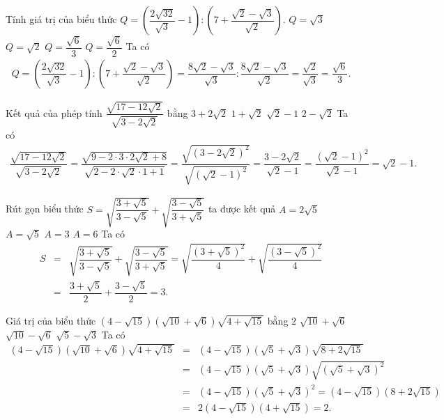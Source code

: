 \begin{bt}
	Tính giá trị của biểu thức $Q=\left(\dfrac{2\sqrt{32}}{\sqrt{3}}-1\right):\left(7+\dfrac{\sqrt{2}-\sqrt{3}}{\sqrt{2}}\right)$.
	\choice
	{$Q=\sqrt{3}$}
	{$Q=\sqrt{2}$}
	{\True $Q=\dfrac{\sqrt{6}}{3}$}
	{$Q=\dfrac{\sqrt{6}}{2}$}
	\loigiai
	{
		Ta có
		\allowdisplaybreaks
		\begin{eqnarray*}
			Q = \left(\dfrac{2\sqrt{32}}{\sqrt{3}}-1\right):\left(7+\dfrac{\sqrt{2}-\sqrt{3}}{\sqrt{2}}\right)=\dfrac{8\sqrt{2}-\sqrt{3}}{\sqrt{3}} : \dfrac{8\sqrt{2}-\sqrt{3}}{\sqrt{2}} =\dfrac{\sqrt{2}}{\sqrt{3}} = \dfrac{\sqrt{6}}{3}.
		\end{eqnarray*}
	}
\end{bt}

\begin{bt}
	Kết quả của phép tính $\dfrac{\sqrt{17-12\sqrt{2}}}{\sqrt{3-2\sqrt{2}}}$ bằng
	\choice
	{$3+2\sqrt{2}$}
	{$1+\sqrt{2}$}
	{\True $\sqrt{2}-1$}
	{$2-\sqrt{2}$}
	\loigiai
	{
		Ta có
		\allowdisplaybreaks
		\begin{eqnarray*}
			\dfrac{\sqrt{17-12\sqrt{2}}}{\sqrt{3-2\sqrt{2}}}=\dfrac{\sqrt{9-2\cdot 3 \cdot 2\sqrt{2}+8}}{\sqrt{2-2\cdot\sqrt{2}\cdot 1+1}} = \dfrac{\sqrt{\left(3-2\sqrt{2}\right)^2}}{\sqrt{\left(\sqrt{2}-1\right)^2}}=\dfrac{3-2\sqrt{2}}{\sqrt{2}-1}=\dfrac{\left(\sqrt{2}-1\right)^2}{\sqrt{2}-1}=\sqrt{2}-1.
		\end{eqnarray*}
	}
\end{bt}

\begin{bt}
	Rút gọn biểu thức $S=\sqrt{\dfrac{3+\sqrt{5}}{3-\sqrt{5}}}+\sqrt{\dfrac{3-\sqrt{5}}{3+\sqrt{5}}}$ ta được kết quả
	\choice
	{$A=2\sqrt{5}$}
	{$A=\sqrt{5}$}
	{\True $A=3$}
	{$A=6$}
	\loigiai
	{
		Ta có
		\allowdisplaybreaks
		\begin{eqnarray*}
			S &=& \sqrt{\dfrac{3+\sqrt{5}}{3-\sqrt{5}}}+\sqrt{\dfrac{3-\sqrt{5}}{3+\sqrt{5}}}=\sqrt{\dfrac{\left(3+\sqrt{5}\right)^2}{4}}+\sqrt{\dfrac{\left(3-\sqrt{5}\right)^2}{4}}\\
			&=& \dfrac{3+\sqrt{5}}{2}+\dfrac{3-\sqrt{5}}{2}=3.
		\end{eqnarray*}
	}
\end{bt}

\begin{bt}
	Giá trị của biểu thức $\left(4-\sqrt{15}\right)\left(\sqrt{10}+\sqrt{6}\right)\sqrt{4+\sqrt{15}}$ bằng
	\choice
	{\True $2$}
	{$\sqrt{10}+\sqrt{6}$}
	{$\sqrt{10}-\sqrt{6}$}
	{$\sqrt{5}-\sqrt{3}$}
	\loigiai
	{
		Ta có
		\allowdisplaybreaks
		\begin{eqnarray*}
			\left(4-\sqrt{15}\right)\left(\sqrt{10}+\sqrt{6}\right)\sqrt{4+\sqrt{15}} &=& \left(4-\sqrt{15}\right)\left(\sqrt{5}+\sqrt{3}\right)\sqrt{8+2\sqrt{15}}\\
			&=& \left(4-\sqrt{15}\right)\left(\sqrt{5}+\sqrt{3}\right)\sqrt{\left(\sqrt{5}+\sqrt{3}\right)^2}\\
			&=& \left(4-\sqrt{15}\right)\left(\sqrt{5}+\sqrt{3}\right)^2= \left(4-\sqrt{15}\right)\left(8+2\sqrt{15}\right)\\
			&=& 2\left(4-\sqrt{15}\right)\left(4+\sqrt{15}\right)=2.
		\end{eqnarray*}
	}
\end{bt}

